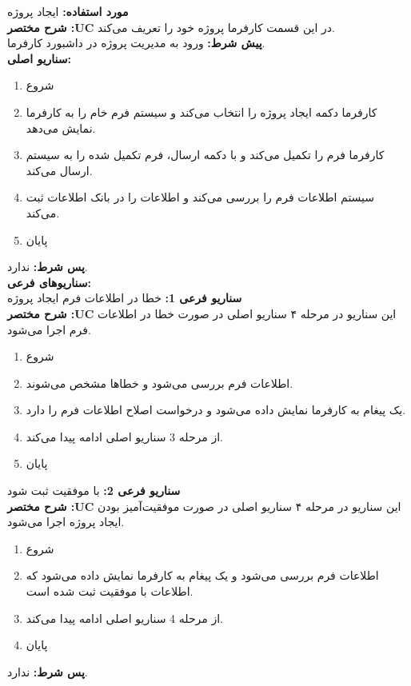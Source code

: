 \textbf{مورد استفاده:}
ایجاد پروژه
\\
\textbf{شرح مختصر :UC}
در این قسمت کارفرما پروژه خود را تعریف می‌کند.
\\
\textbf{پيش شرط:}
ورود به مدیریت پروژه در داشبورد کارفرما.
\\
\textbf{سناريو اصلی:}
\begin{enumerate}
\item
شروع
\item
کارفرما دکمه ایجاد پروژه را انتخاب می‌کند و سیستم فرم خام را به کارفرما نمایش می‌دهد.
\item
کارفرما فرم را تکمیل می‌کند و با دکمه ارسال، فرم تکمیل شده را به سیستم ارسال می‌کند.
\item
سیستم اطلاعات فرم را بررسی می‌کند و اطلاعات را در بانک اطلاعات ثبت می‌کند.
\item
پایان
\end{enumerate}

\noindent
\textbf{پس شرط:}
ندارد.
\\
\textbf{سناريوهای فرعی:}
\\
\textbf{سناريو فرعی 1:}
خطا در اطلاعات فرم ایجاد پروژه
\\
\textbf{شرح مختصر :UC}
این سناریو در مرحله ۴ سناریو اصلی در صورت خطا در اطلاعات فرم اجرا می‌شود.
\begin{enumerate}
\item
شروع
\item
اطلاعات فرم بررسی می‌شود و خطاها مشخص می‌شوند.
\item
یک پیغام به کارفرما نمایش داده می‌شود و درخواست اصلاح اطلاعات فرم را دارد.
\item
از مرحله 3 سناریو اصلی ادامه پیدا می‌کند.
\item
پایان
\end{enumerate}

\noindent
\textbf{سناريو فرعی 2:}
با موفقیت ثبت شود
\\
\textbf{شرح مختصر :UC}
این سناریو در مرحله ۴ سناریو اصلی در صورت موفقیت‌آمیز بودن ایجاد پروژه اجرا می‌شود.
\begin{enumerate}
\item
شروع
\item
اطلاعات فرم بررسی می‌شود و یک پیغام به کارفرما نمایش داده می‌شود که اطلاعات با موفقیت ثبت شده است.
\item
از مرحله 4 سناریو اصلی ادامه پیدا می‌کند.
\item
پایان
\end{enumerate}

\noindent
\textbf{پس شرط:}
ندارد.


